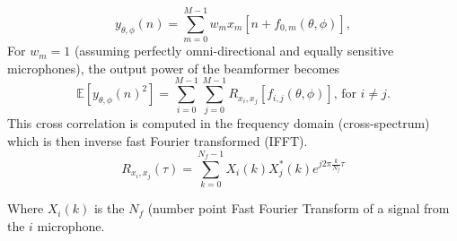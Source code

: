 \begin{equation}
    y_{\theta,\phi}(n)=\sum\limits_{m=0}^{M-1}{w_m x_m[n + f_{0,m}(\theta,\phi)]},
\end{equation}
For $w_m=1$ (assuming perfectly omni-directional and equally sensitive microphones), the output power of the beamformer becomes
\begin{equation}
    \mathbb{E}[{y_{\theta,\phi}(n)^2}]=\sum\limits_{i=0}^{M-1}\sum\limits_{j=0}^{M-1}{R_{x_i,x_j}[f_{i,j}(\theta,\phi)]} \text{, for } i\neq j.
    \label{eq:poweroutputbeamformer}
\end{equation}
This cross correlation is computed in the frequency domain (cross-spectrum) which is then inverse fast Fourier transformed (IFFT).
\begin{equation}
    R_{x_i,x_j}(\tau)= \sum\limits_{k=0}^{N_{f}-1}{X_{i}(k)X_{j}^*(k)e^{j2\pi\frac{k}{N_{f}}\tau}}
\end{equation}

Where $X_{i}(k)$ is the $N_{f}$ (number  point Fast Fourier Transform of a signal from the $i$ microphone.  

